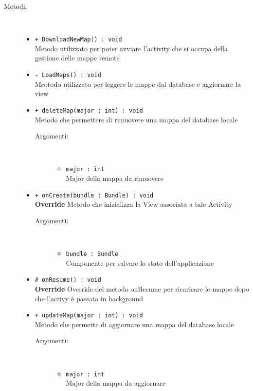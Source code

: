 \documentclass[../DefinizioneDiProdotto.tex]{subfiles}
\begin{document}
\begin{description}
\begin{itemize}
	\end{itemize}
	\item[Metodi:] \
	\begin{itemize}
		\item \texttt{+ DownloadNewMap() : void}\\
		Metodo utilizzato per poter avviare l'activity che si occupa della gestione delle mappe remote
		\item \texttt{- LoadMaps() : void}\\
		Meotodo utilizzato per leggere le mappe dal database e aggiornare la view
		\item \texttt{+ deleteMap(major : int) : void}\\
		Metodo che permettere di rimuovere una mappa del database locale
		\begin{description}
			\item[Argomenti:] \
			\begin{itemize}
				\item \texttt{major : int}\\
				Major della mappa da rimuovere\end{itemize}
		\end{description}
		\item \texttt{+ onCreate(bundle : Bundle) : void}\\
		\textbf{Override} Metodo che inizializza la View associata a tale Activity
		\begin{description}
			\item[Argomenti:] \
			\begin{itemize}
				\item \texttt{bundle : Bundle}\\
				Componente per salvare lo stato dell'applicazione\end{itemize}
		\end{description}
		\item \texttt{\# onResume() : void}\\
		\textbf{Override} Override del metodo onResume per ricaricare le mappe dopo che l'activy è passata in background
		\item \texttt{+ updateMap(major : int) : void}\\
		Metodo che permette di aggiornare una mappa del database locale
		\begin{description}
			\item[Argomenti:] \
			\begin{itemize}
				\item \texttt{major : int}\\
				Major della mappa da aggiornare\end{itemize}
		\end{description}
	\end{itemize}
\end{description}
\end{document}
